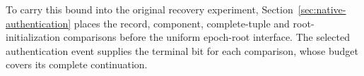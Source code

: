 To carry this bound into the original recovery experiment,
Section~\ref{sec:native-authentication} places the record, component,
complete-tuple and root-initialization comparisons before the uniform
epoch-root interface. The selected authentication event supplies the
terminal bit for each comparison, whose budget covers its complete
continuation.
